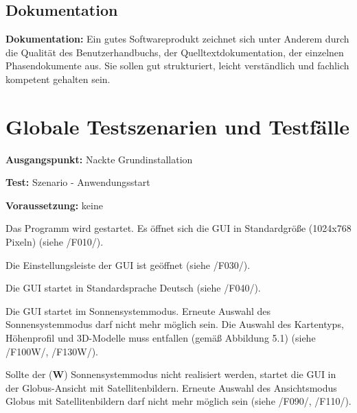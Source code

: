 \documentclass[10pt]{scrreprt}
\newenvironment{details}[1][6pt]{%
  \parskip#1 \parindent6mm \raggedright%
  \def\item{\par\ignorespaces\hangindent=5mm \hangafter1}}{%
  \par\ignorespaces}
\newcommand{\sfbf}[1]{\textbf{\sffamily #1}}
\newcommand{\W}{\sfbf{W}}
\newcommand{\ziel}[1]{{\fontsize{9.5}{11}\textsf{/#1/}}}
\newcommand{\ziellabel}{Z}
\newcommand{\muss}{\renewcommand{\labelenumi}{\textbf{\ziel{\ziellabel\numprint{\theenumi}0}}}}
\newcommand{\wunsch}{\renewcommand{\labelenumi}{\textbf{\ziel{\ziellabel\numprint{\theenumi}0W}}}}
\begin{document}
\section*{Dokumentation}
\begin{details}
\item \sfbf{Dokumentation:} Ein gutes Softwareprodukt zeichnet sich unter Anderem durch die Qualität des Benutzerhandbuchs, der Quelltextdokumentation, der einzelnen Phasendokumente aus. Sie sollen gut strukturiert, leicht verständlich und fachlich kompetent gehalten sein. 
\end{details}




\chapter{Globale Testszenarien und Testfälle}

\renewcommand{\ziellabel}{T}

\begin{details}[2pt]
\item \sfbf{Ausgangspunkt:} Nackte Grundinstallation 
\item \sfbf{Test:} Szenario - Anwendungsstart 
\item \sfbf{Voraussetzung:} keine
\end{details}
\vspace{2mm}
\begin{enumerate}[leftmargin = 2.2cm]
\item Das Programm wird gestartet. Es öffnet sich die GUI in Standardgröße (1024x768 Pixeln) (siehe \ziel{F010}).
\item Die Einstellungsleiste der GUI ist geöffnet (siehe \ziel{F030}).
\item Die GUI startet in Standardsprache Deutsch (siehe \ziel{F040}).
\wunsch
\item Die GUI startet im Sonnensystemmodus. Erneute Auswahl des Sonnensystemmodus darf nicht mehr möglich sein. Die Auswahl des Kartentyps, Höhenprofil und 3D-Modelle muss entfallen (gemäß Abbildung 5.1) (siehe \ziel{F100W}, \ziel{F130W}).
\muss
\item Sollte der (\W) Sonnensystemmodus nicht realisiert werden, startet die GUI in der Globus-Ansicht mit Satellitenbildern. Erneute Auswahl des Ansichtsmodus Globus mit Satellitenbildern darf nicht mehr möglich sein (siehe \ziel{F090}, \ziel{F110}).
\end{enumerate}
\end{document}
